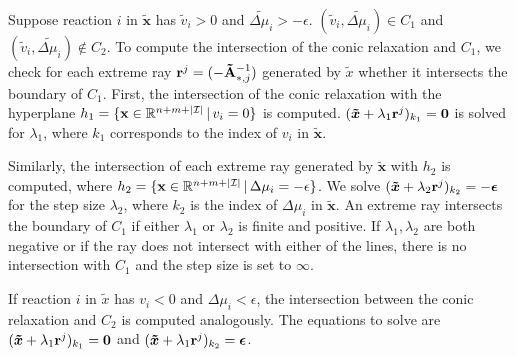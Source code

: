 Suppose reaction $i$ in $\boldsymbol{\tilde x}$ has $\tilde v_i >0$ and $\tilde{\Delta \mu_i} >- \epsilon$. $(\tilde v_i, \tilde{\Delta \mu_i}) \in C_1$ and $(\tilde v_i, \tilde{\Delta \mu_i}) \not \in C_2$. %
To compute the intersection of the conic relaxation and $C_1$, we check for each extreme ray $\bold r^j = (- \bold{\tilde A}^{-1}_{*,j})$ generated by $\tilde x$ whether it intersects the boundary of $C_1$. 
First, the intersection of the conic relaxation with the hyperplane $h_1 = \{\bold x \in \mathbb{R}^{n + m + |\mathcal{I}|} \, | \, v_i = 0 \} $ is computed. $(\boldsymbol{\tilde x} + \lambda_1 \bold r^j)_{k_1} = \bold 0$ is solved for $\lambda_1$, where $k_1$ corresponds to the index of $v_i$ in $\boldsymbol{\tilde x}$.

Similarly, the intersection of each extreme ray generated by $\boldsymbol{\tilde x}$ with $h_2$ is computed, where $h_2 = \{\bold x \in \mathbb{R}^{n + m + |\mathcal{I}|} \, | \, \Delta \mu_i = -\epsilon \}$. We solve $(\boldsymbol{\tilde x} + \lambda_2 \bold r^j)_{k_2} = -\boldsymbol \epsilon$ for the step size $\lambda_2$, where $k_2$ is the index of $\Delta \mu_i$ in $\boldsymbol{\tilde x}$. 
An extreme ray intersects the boundary of $C_1$ if either $\lambda_1$ or $\lambda_2$ is finite and positive. If $\lambda_1, \lambda_2$ are both negative or if the ray does not intersect with either of the lines, there is no intersection with $C_1$ and the step size is set to $\infty$. 

If reaction $i$ in $\tilde x$ has $v_i <0$ and $\Delta \mu_i < \epsilon$, the intersection between the conic relaxation and $C_2$ is computed analogously. The equations to solve are $(\boldsymbol{\tilde x} + \lambda_1 \bold r^j)_{k_1} = \bold 0$ and $(\boldsymbol{\tilde x} + \lambda_1 \bold r^j)_{k_2} = \boldsymbol \epsilon$.

